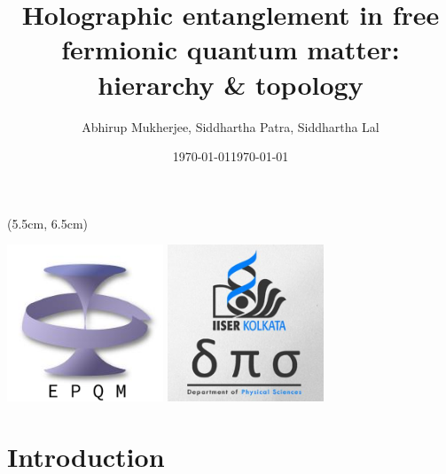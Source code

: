 \documentclass[11pt,aspectratio=169]{beamer}
\title{
	{Holographic entanglement in free \\ fermionic quantum matter: hierarchy \& topology}
}
\date{\today}
\author{Abhirup Mukherjee, Siddhartha Patra, Siddhartha Lal}
\institute{Department of Physical Sciences, IISER Kolkata, Mohanpur}
\date{\today}
\begin{document}
\centering

\begin{frame}
\maketitle
\begin{textblock*}{0.4\textwidth}(5.5cm, 6.5cm)
	\centering
	\vspace*{\fill}

	\includegraphics[width=0.35\textwidth]{figures/epqm_logo_mod.jpeg}
	\hspace*{\fill}
	\includegraphics[width=0.35\textwidth]{figures/dps_logo.jpeg}

	\vspace*{\fill}
\end{textblock*}
\end{frame}

\section{Introduction}
\end{document}
